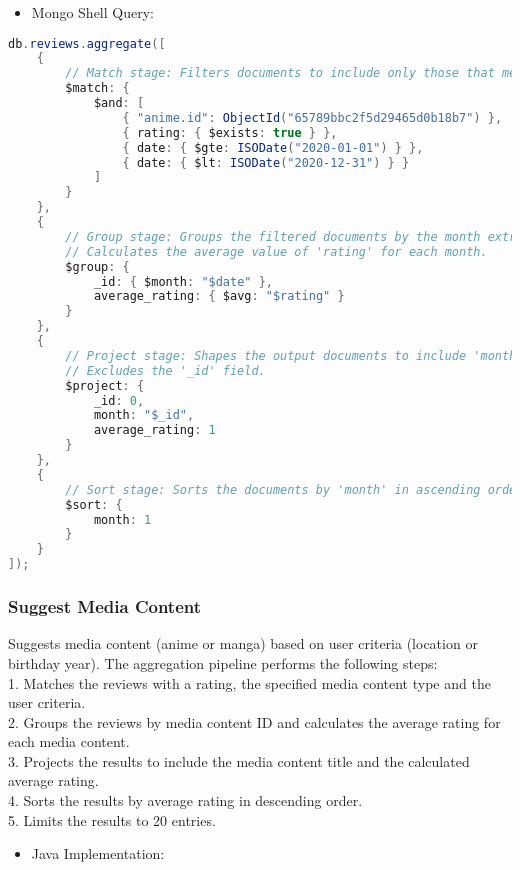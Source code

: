 \begin{itemize}
    \item Mongo Shell Query:
\end{itemize}

\begin{mdframed}[style=customstyle2]
\begin{lstlisting}[language=java, backgroundcolor=\color{white}]
db.reviews.aggregate([
    { 
        // Match stage: Filters documents to include only those that meet the specified conditions.
        $match: { 
            $and: [
                { "anime.id": ObjectId("65789bbc2f5d29465d0b18b7") },
                { rating: { $exists: true } },
                { date: { $gte: ISODate("2020-01-01") } },
                { date: { $lt: ISODate("2020-12-31") } }
            ]
        } 
    },
    { 
        // Group stage: Groups the filtered documents by the month extracted from the 'date' field.
        // Calculates the average value of 'rating' for each month.
        $group: { 
            _id: { $month: "$date" },
            average_rating: { $avg: "$rating" }
        } 
    },
    { 
        // Project stage: Shapes the output documents to include 'month' and 'average_rating' fields.
        // Excludes the '_id' field.
        $project: { 
            _id: 0,
            month: "$_id",
            average_rating: 1
        } 
    },
    { 
        // Sort stage: Sorts the documents by 'month' in ascending order.
        $sort: { 
            month: 1 
        } 
    }
]);\end{lstlisting}
\end{mdframed}

\subsubsection*{Suggest Media Content}

Suggests media content (anime or manga) based on user criteria (location or birthday year).
The aggregation pipeline performs the following steps:\\
1. Matches the reviews with a rating, the specified media content type and the user criteria.\\
2. Groups the reviews by media content ID and calculates the average rating for each media content.\\
3. Projects the results to include the media content title and the calculated average rating.\\
4. Sorts the results by average rating in descending order.\\
5. Limits the results to 20 entries.
\begin{itemize}
    \item Java Implementation:
\end{itemize}

